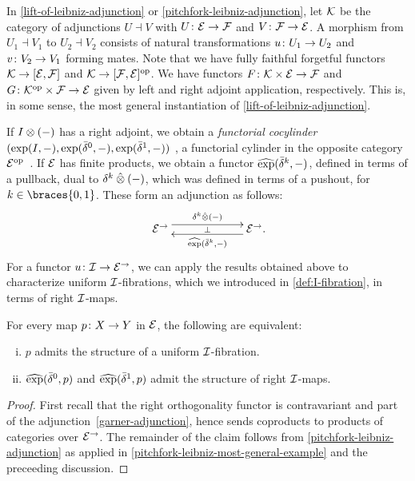 \documentclass[reqno,10pt,a4paper,oneside,draft]{amsart}
\begin{document}
\begin{remark} \label{pitchfork-leibniz-most-general-example}
In \cref{lift-of-leibniz-adjunction} or \cref{pitchfork-leibniz-adjunction}, let $\cal{K}$ be the category of adjunctions $U \dashv V$ with $U \co \catE \to \cal{F}$ and $V \co \cal{F} \to \catE$.
A morphism from $U_1 \dashv V_1$ to $U_2 \dashv V_2$ consists of natural transformations $u \co U_1 \to U_2$ and $v \co V_2 \to V_1$ forming mates.
Note that we have fully faithful forgetful functors $\cal{K} \to [\catE, \cal{F}]$ and $\cal{K} \to [\cal{F}, \catE]^{\op}$.
We have functors $F \co \cal{K} \times \catE \to \cal{F}$ and $G \co \cal{K}^{\op} \times \cal{F} \to \catE$ given by left and right adjoint application, respectively.
This is, in some sense, the most general instantiation of \cref{lift-of-leibniz-adjunction}.
\end{remark}

\medskip

If $\interval \otimes (-)$ has a right adjoint, we obtain a \emph{functorial cocylinder} $(\exp(\interval, -), \exp(\bar{\delta}^0, -), \exp(\bar{\delta}^1, -))$ , \ie a functorial cylinder in the opposite category $\catE^{\op}$~\cite{kamps-porter:homotopy}.
If $\calE$ has finite products, we obtain a functor $\hatexp(\bar{\delta}^k, -)$, defined in terms of a pullback, dual to $\kcyl \hatotimes (-)$, which was defined in terms of a pushout, for~$k \in \braces{0, 1}$.
These form an adjunction as follows:
\[
\xymatrix@C+4em{
  \catE^\to \ar@<1ex>[r]^{\kcyl \hatotimes (-)} \ar@{}[r]|{\bot} &
  \catE^\to \rlap{.} \ar@<1ex>[l]^{\hatexp(\bar{\delta}^k, -)}
}
\]
For a functor $u \co \cal{I} \to \catE^\to$, we can apply the results obtained above to characterize uniform $\cal{I}$-fibrations, which we introduced in \cref{def:I-fibration}, in terms of right $\cal{I}$-maps.

\begin{proposition} \label{prod-exp-general}
For every map $p \co X \to Y$ in $\catE$, the following are equivalent:
\begin{enumerate}[(i)]
\item $p$ admits the structure of a uniform $\cal{I}$-fibration.
\item $\hatexp(\bar{\delta}^0, p)$ and $\hatexp(\bar{\delta}^1, p)$ admit the structure of right $\cal{I}$-maps.
\end{enumerate}
\end{proposition}

\begin{proof}
First recall that the right orthogonality functor is contravariant and part of the adjunction~\eqref{garner-adjunction}, hence sends coproducts to products of categories over $\catE^\to$.
The remainder of the claim follows from \cref{pitchfork-leibniz-adjunction} as applied in \cref{pitchfork-leibniz-most-general-example} and the preceeding discussion.
\end{proof}
\end{document}
